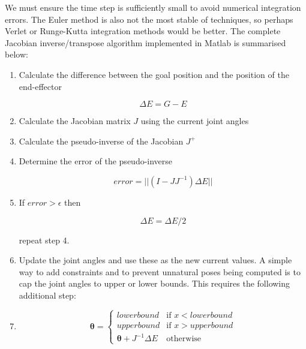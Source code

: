\documentclass[paper=a4, fontsize=11pt]{scrartcl} %
\numberwithin{equation}{section} %
\numberwithin{figure}{section} %
\numberwithin{table}{section} %
\newcommand{\params}{\boldsymbol{\theta}}
\begin{document}
We must ensure the time step is sufficiently small to avoid numerical integration errors. The Euler method is also not the most stable of techniques, so perhaps Verlet or Runge-Kutta integration methods would be better. The complete Jacobian inverse/transpose algorithm implemented in Matlab is summarised below:

\begin{enumerate}
\item
Calculate the difference between the goal position and the position of the end-effector

\begin{equation}
\Delta E = G - E
\end{equation}

\item
Calculate the Jacobian matrix $J$ using the current joint angles

\item
Calculate the pseudo-inverse of the Jacobian $J^+$

\item
Determine the error of the pseudo-inverse

\begin{equation}
error = ||(I - JJ^{-1})\Delta E||
\end{equation}

\item
If $error > \epsilon$ then

\begin{equation}
\Delta E = \Delta E / 2
\end{equation}  

repeat step 4.


\item
Update the joint angles and use these as the new current values.
A simple way to add constraints and to prevent unnatural poses being computed is to cap the joint angles to upper or lower bounds. This requires the following additional step:

\item
\begin{equation*}
\params = \left\{
\begin{array}{rl}
lowerbound & \text{if } x < lowerbound\\
upperbound & \text{if } x > upperbound\\
\params + J^{-1}\Delta E & \text{otherwise}
\end{array} \right.
\end{equation*}
\end{enumerate}
\end{document}
